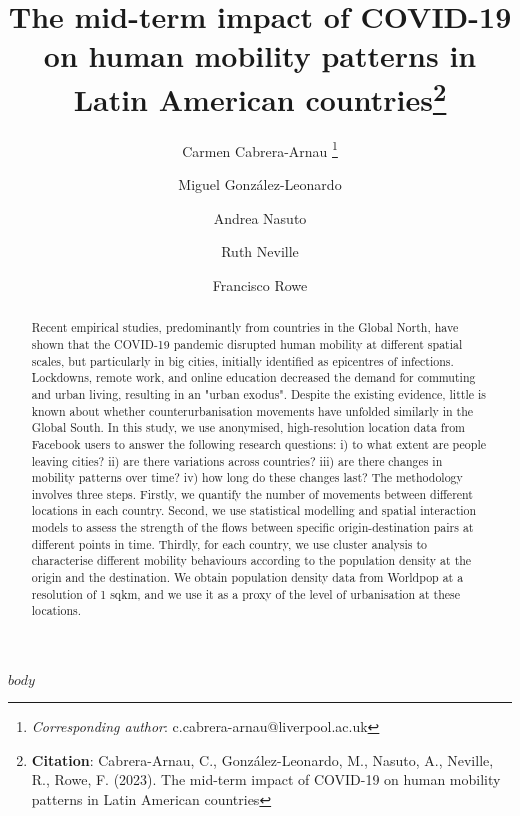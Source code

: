 \documentclass[11pt,letterpaper]{article}
\title{The mid-term impact of COVID-19 on human mobility patterns in Latin American countries\footnote{\textbf{Citation}: Cabrera-Arnau, C., González-Leonardo, M., Nasuto, A., Neville, R., Rowe, F. (2023). The mid-term impact of COVID-19 on human mobility patterns in Latin American countries}}
\author[1]{Carmen Cabrera-Arnau \thanks{\textit{Corresponding author}: c.cabrera-arnau@liverpool.ac.uk}}
\author[2]{Miguel González-Leonardo}
\author[1]{Andrea Nasuto}
\author[1]{Ruth Neville}
\author[1]{Francisco Rowe}
\affil[1]{Geographic Data Science Lab, Department of Geography and Planning, University of Liverpool, Liverpool, United Kingdom}
\affil[2]{Center for Demographic, Urban and Environmental Studies, El Colegio de México (COLMEX), Mexico City, Mexico}
\date{}
\begin{document}
\maketitle


\begin{abstract}

Recent empirical studies, predominantly from countries in the Global North, have shown that the COVID-19 pandemic disrupted human mobility at different spatial scales, but particularly in big cities, initially identified as epicentres of infections. Lockdowns, remote work, and online education decreased the demand for commuting and urban living, resulting in an "urban exodus". Despite the existing evidence, little is known about whether counterurbanisation movements have unfolded similarly in the Global South. In this study, we use anonymised, high-resolution location data from Facebook users to answer the following research questions: i) to what extent are people leaving cities? ii) are there variations across countries? iii) are there changes in mobility patterns over time? iv) how long do these changes last? The methodology involves three steps. Firstly, we quantify the number of movements between different locations in each country. Second, we use statistical modelling and spatial interaction models to assess the strength of the flows between specific origin-destination pairs at different points in time. Thirdly, for each country, we use cluster analysis to characterise different mobility behaviours according to the population density at the origin and the destination. We obtain population density data from Worldpop at a resolution of 1 sqkm, and we use it as a proxy of the level of urbanisation at these locations. 

\end{abstract}



\pagebreak

$body$




\setlength{\bibsep}{0.00cm plus 0.05cm} %


\end{document}
